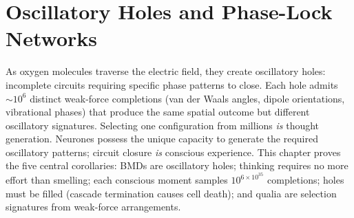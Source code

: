 \chapter{Oscillatory Holes and Phase-Lock Networks}
\label{ch:oscillatory_holes}


\begin{chapterabstract}
As oxygen molecules traverse the \Hplus electric field, they create oscillatory holes: incomplete circuits requiring specific phase patterns to close. Each hole admits $\sim 10^6$ distinct weak-force completions (van der Waals angles, dipole orientations, vibrational phases) that produce the same spatial outcome but different oscillatory signatures. Selecting one configuration from millions \emph{is} thought generation. Neurones possess the unique capacity to generate the required oscillatory patterns; circuit closure \emph{is} conscious experience. This chapter proves the five central corollaries: BMDs are oscillatory holes; thinking requires no more effort than smelling; each conscious moment samples $10^{6 \times 10^{35}}$ completions; holes must be filled (cascade termination causes cell death); and qualia are selection signatures from weak-force arrangements.
\end{chapterabstract}



